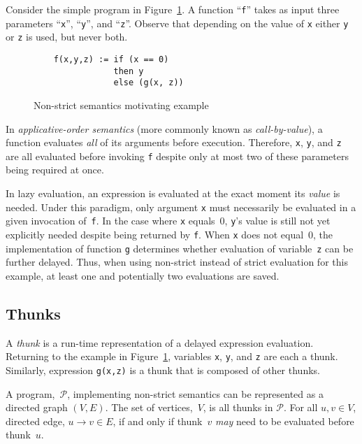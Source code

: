 \documentclass[11pt]{article}
\begin{document}
Consider the simple program in Figure~\ref{fig:LazyEvalExample}.  A function ``\texttt{f}'' takes as input three parameters ``\texttt{x}'', ``\texttt{y}'', and ``\texttt{z}''.  Observe that depending on the value of \texttt{x} either \texttt{y} or \texttt{z} is used, but never both.~\cite{Henderson:1976}

\begin{figure}[ht]
  \centering
  \begin{lstlisting}
    f(x,y,z) := if (x == 0)
                then y
                else (g(x, z))
  \end{lstlisting}
  \caption{Non-strict semantics motivating example}
  \label{fig:LazyEvalExample}
\end{figure}

In \textit{applicative-order semantics} (more commonly known as \textit{call-by-value}), a function evaluates \textit{all} of its arguments before execution.  Therefore, \texttt{x}, \texttt{y}, and \texttt{z} are all evaluated before invoking \texttt{f} despite only at most two of these parameters being required at once.

In lazy evaluation, an expression is evaluated at the exact moment its \textit{value} is needed.  Under this paradigm, only argument \texttt{x} must necessarily be evaluated in a given invocation of~\texttt{f}. In the case where \texttt{x} equals~0, \texttt{y}'s value is still not yet explicitly needed despite being returned by \texttt{f}.  When \texttt{x} does not equal~0, the implementation of function \texttt{g} determines whether evaluation of variable~\texttt{z} can be further delayed. Thus, when using non-strict instead of strict evaluation for this example, at least one and potentially two evaluations are saved.

\subsection{Thunks}\label{sec:Thunks}

A \textit{thunk} is a run-time representation of a delayed expression evaluation.  Returning to the example in Figure~\ref{fig:LazyEvalExample}, variables \texttt{x}, \texttt{y}, and \texttt{z} are each a thunk.  Similarly, expression \texttt{g(x,z)} is a thunk that is composed of other thunks.

A program,~$\mathcal{P}$, implementing non-strict semantics can be represented as a directed graph $(V,E)$.  The set of vertices,~$V$, is all thunks in $\mathcal{P}$.  For all ${u,v\in V}$, directed edge, ${u \rightarrow v \in E}$, if and only if thunk~$v$ \textit{may} need to be evaluated before thunk~$u$.
\end{document}
